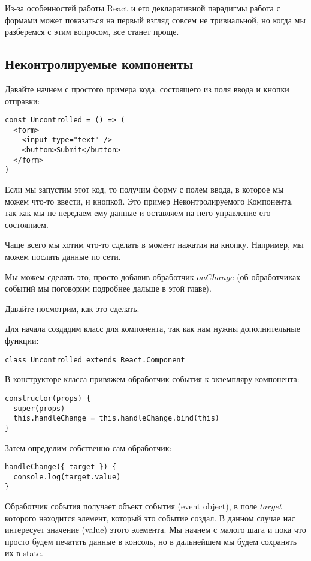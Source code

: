 Из-за особенностей работы React и его декларативной парадигмы работа с формами может показаться на первый взгляд совсем не тривиальной, но когда мы разберемся с этим вопросом, все станет проще.

\subsection{Неконтролируемые компоненты}

Давайте начнем с простого примера кода, состоящего из поля ввода и кнопки отправки:

\begin{lstlisting}
const Uncontrolled = () => (
  <form>
    <input type="text" />
    <button>Submit</button>
  </form>
)
\end{lstlisting}

Если мы запустим этот код, то получим форму с полем ввода, в которое мы можем что-то ввести, и кнопкой. Это пример Неконтролируемого Компонента, так как мы не передаем ему данные и оставляем на него управление его состоянием.

Чаще всего мы хотим что-то сделать в момент нажатия на кнопку. Например, мы можем послать данные по сети.

Мы можем сделать это, просто добавив обработчик $onChange$ (об обработчиках событий мы поговорим подробнее дальше в этой главе).

Давайте посмотрим, как это сделать.

Для начала создадим класс для компонента, так как нам нужны дополнительные функции:
\begin{lstlisting}
class Uncontrolled extends React.Component	
\end{lstlisting}

В конструкторе класса привяжем обработчик события к экземпляру компонента:

\begin{lstlisting}
constructor(props) {
  super(props)
  this.handleChange = this.handleChange.bind(this)
}
\end{lstlisting}

Затем определим собственно сам обработчик:

\begin{lstlisting}
handleChange({ target }) {
  console.log(target.value)
}
\end{lstlisting}

Обработчик события получает объект события (event object), в поле $target$ которого находится элемент, который это событие создал. В данном случае нас интересует значение (value) этого элемента. Мы начнем с малого шага и пока что просто будем печатать данные в консоль, но в дальнейшем мы будем сохранять их в state.

